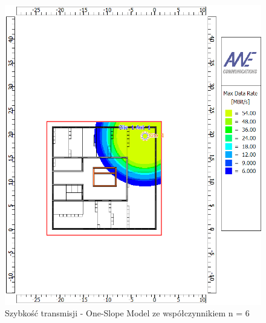 \documentclass[12pt, a4paper, oneside]{article}
\begin{document}
\begin{figure}[h]
\centering
\caption{Szybkość transmisji - One-Slope Model ze współczynnikiem n = 6}
\includegraphics[scale=0.65]{ONE_SLOPE_RATE_EXP_6.png}
\end{figure}
\clearpage
\end{document}
